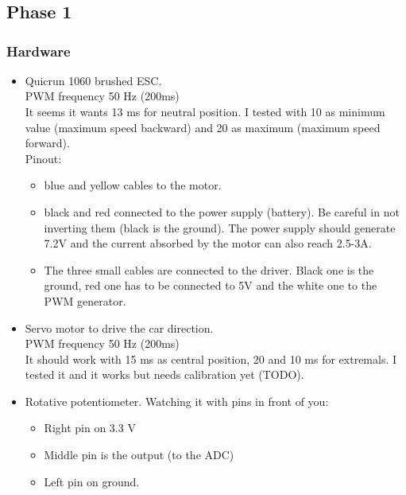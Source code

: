 

\chapter{}
\vspace*{1cm}

\section{Phase 1}
\subsection{Hardware}
\begin{itemize}
\item Quicrun 1060 brushed ESC. \\
   PWM frequency 50 Hz (200ms)\\
   It seems it wants 13 ms for neutral position. I tested with 10 as minimum value (maximum speed backward) and 20 as maximum (maximum speed forward).\\ 
  Pinout: 
  \begin{itemize}
    \item blue and yellow cables to the motor.
    \item black and red connected to the power supply (battery). Be careful in not inverting them (black is the ground). The 
      power supply should generate 7.2V and the current absorbed by the motor can also reach 2.5-3A.
    \item The three small cables are connected to the driver. Black one is the ground, red one has to be connected to 5V and the white one
      to the PWM generator.
  \end{itemize}
 
\item Servo motor to drive the car direction.\\
  PWM frequency 50 Hz (200ms)\\
  It should work with 15 ms as central position, 20 and 10 ms for extremals. I tested it and it works but needs calibration yet (TODO).
  
\item Rotative potentiometer.
  Watching it with pins in front of you:
  \begin{itemize}
    \item Right pin on 3.3 V
    \item Middle pin is the output (to the ADC)
    \item Left pin on ground.
  \end{itemize}


\end{itemize}
